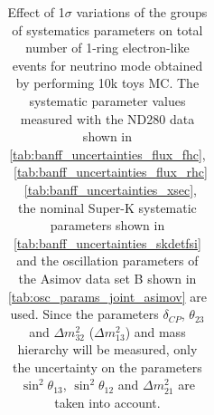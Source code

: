 \begin{table}[htb]
\begin{tabular}{| c | c | c |}
\end{tabular}
\caption{
 Effect of 1$\sigma$ variations of the groups of systematics parameters on total number of
 1-ring electron-like events for neutrino mode obtained by performing 10k toys MC.
The systematic parameter values measured with the ND280 data 
shown in 
\cref{tab:banff_uncertainties_flux_fhc},
~\ref{tab:banff_uncertainties_flux_rhc}
~\ref{tab:banff_uncertainties_xsec},
the nominal Super-K systematic parameters shown in \cref{tab:banff_uncertainties_skdetfsi}
and the oscillation parameters of the Asimov data set B shown in \cref{tab:osc_params_joint_asimov}
are used.
Since the parameters $\delta_{CP}$, $\theta_{23}$ and $\Delta m^2_{32}$ ($\Delta m^2_{13}$) and mass hierarchy
will be measured,
only the uncertainty on the parameters 
$\sin^2 \theta_{13}$,
$\sin^2 \theta_{12}$
and 
$\Delta m^2_{21}$ 
are taken into account.
}                                                                                                                                                                                          
\label{tab:nsk_systematic_table_summary_joint_asimov_B_fhc_elike_Run17c}
\end{table}





